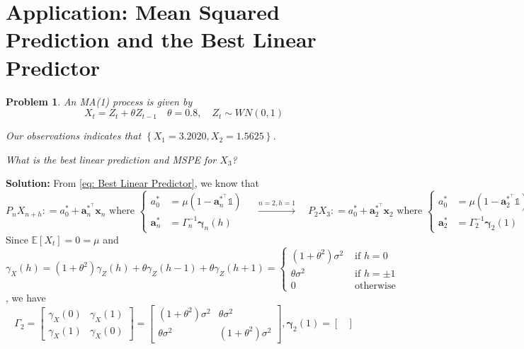 \documentclass[11pt]{article}
\theoremstyle{plain} %
\newtheorem{problem}[theorem]{Problem}
\newenvironment{solution}
{\color{C2}\normalfont\begin{framed}\begingroup\textbf{Solution:} }
  {\endgroup\end{framed}}
\theoremstyle{remark}
\newcommand{\bOne}{\mathds{1}}
\newcommand{\EE}{\mathbb{E}}
\begin{document}
\section{Application: Mean Squared Prediction and the Best Linear Predictor}
\begin{problem}
An MA(1) process is given by
$$
  X_{t}=Z_{t}+\theta Z_{t-1} \quad \theta=0.8, \quad Z_{t} \sim W N(0,1)
$$

Our observations indicates that $\left\{X_{1}=3.2020, X_{2}=1.5625\right\}$.

What is the best linear prediction and MSPE for $X_{3}$?
\end{problem}

\begin{solution}
  From \cref{eq: Best Linear Predictor}, we know that
  $$
    P_n X_{n+h} : = a_0^* + \mathbf{a}_n^{*^\top} \mathbf{x}_n \text{ where }
    \begin{cases}
      a_0^*          & = \mu(1-\mathbf{a}_n^{*^\top}\bOne) \\
      \mathbf{a}_n^* & = \Gamma_n^{-1}\bm{\gamma}_n(h)
    \end{cases}
    \quad \xrightarrow{n=2, h=1} \quad
    P_2 X_{3} : = a_0^* + \mathbf{a}_2^{*^\top} \mathbf{x}_2 \text{ where }
    \begin{cases}
      a_0^*          & = \mu(1-\mathbf{a}_2^{*^\top}\bOne) \\
      \mathbf{a}_2^* & = \Gamma_2^{-1}\bm{\gamma}_2(1)
    \end{cases}
  $$
  Since $\EE[X_t] = 0 = \mu$ and $\gamma_X(h) = (1+\theta^2)\gamma_Z(h) + \theta\gamma_Z(h-1) + \theta\gamma_Z(h+1) = \begin{cases}
      (1+\theta^2)\sigma^2 & \text{ if } h = 0     \\
      \theta\sigma^2       & \text{ if } h = \pm 1 \\
      0                    & \text{ otherwise }
    \end{cases}$, we have
  $$
    \Gamma_2 = \begin{bmatrix}
      \gamma_X(0) & \gamma_X(1) \\
      \gamma_X(1) & \gamma_X(0)
    \end{bmatrix} = \begin{bmatrix}
      (1+\theta^2)\sigma^2 & \theta\sigma^2       \\
      \theta\sigma^2       & (1+\theta^2)\sigma^2
    \end{bmatrix},
    \bm{\gamma}_2(1) = \begin{bmatrix}

\end{bmatrix}$$
\end{solution}
\end{document}
